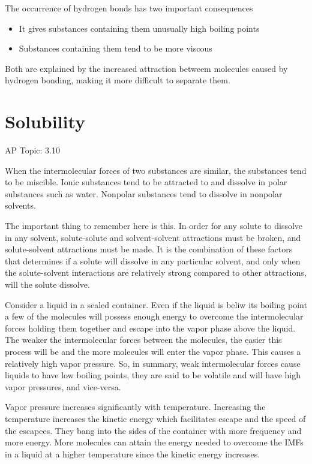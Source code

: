 \documentclass[../chem.tex]{subfiles}
\begin{document}
The occurrence of hydrogen bonds has two important consequences
\begin{itemize}
    \item It gives substances containing them unusually high boiling points 
    \item Substances containing them tend to be more viscous 
\end{itemize}

Both are explained by the increased attraction betweem molecules caused by hydrogen bonding, making it more difficult to separate them.

\section{Solubility}
AP Topic: 3.10

When the intermolecular forces of two substances are similar, the substances tend to be miscible. Ionic substances tend to be attracted to
and dissolve in polar substances such as water. Nonpolar substances tend to dissolve in nonpolar solvents. 

The important thing to remember here is this. In order for any solute to dissolve in any solvent, solute-solute and solvent-solvent attractions 
must be broken, and solute-solvent attractions must be made. It is the combination of these factors that determines if a solute will dissolve in 
any particular solvent, and only when the solute-solvent interactions are relatively strong compared to other attractions, will the solute dissolve.

Consider a liquid in a sealed container. Even if the liquid is beliw its boiling point a few of the molecules will possess enough energy 
to overcome the intermolecular forces holding them together and escape into the vapor phase above the liquid. The weaker the intermolecular forces 
between the molecules, the easier this process will be and the more molecules will enter the vapor phase. This causes a relatively high vapor pressure.
So, in summary, weak intermolecular forces cause liquids to have low boiling points, they are said to be volatile and will have high vapor pressures, and vice-versa.

Vapor pressure increases significantly with temperature. Increasing the temperature increases the kinetic energy which facilitates escape 
and the speed of the escapees. They bang into the sides of the container with more frequency and more energy. More molecules can attain the energy needed to 
overcome the IMFs in a liquid at a higher temperature since the kinetic energy increases.
\end{document}
